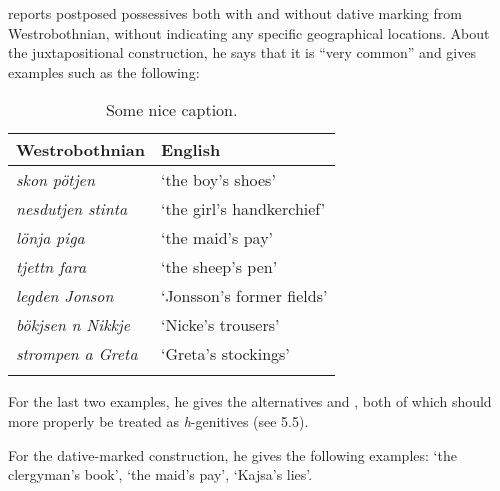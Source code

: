 
\citet[125]{Larsson1929} reports postposed possessives both with and without dative marking from Westrobothnian, without indicating any specific geographical locations. About the juxtapositional construction, he says that it is “very common” and gives examples such as the following:


\begin{table}
\begin{tabular}{ll}
\lsptoprule Westrobothnian & English \\
\midrule 
\textit{skon pötjen} & ‘the boy’s shoes’\\ 
\textit{nesdutjen stinta} & ‘the girl’s handkerchief’\\ 
\textit{lönja piga} & ‘the maid’s pay’\\ 
\textit{tjettn fara} & ‘the sheep’s pen’\\ 
\textit{legden Jonson} & ‘Jonsson’s former fields’\\ 
\textit{bökjsen n Nikkje} & ‘Nicke’s trousers’\\ 
\textit{strompen a Greta} & ‘Greta’s stockings’\\
\lspbottomrule
\end{tabular}
\caption{Some nice caption.}
\label{tab:5.1}
\end{table} 


For the last two examples, he gives the alternatives  and , both of which should more properly be treated as \textit{h}{}-genitives (see 5.5).


For the dative-marked construction, he gives the following examples:  ‘the clergyman’s book’,  ‘the maid’s pay’, ‘Kajsa’s lies’. 


